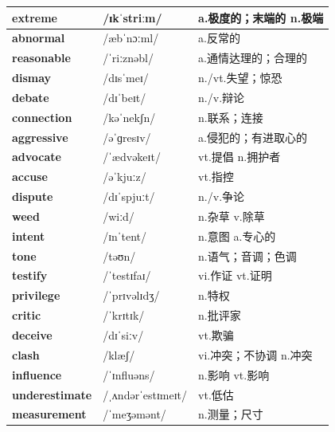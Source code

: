 \documentclass[14pt,a4paper]{extarticle}
\begin{document}
\begin{longtable}{ p{} p{} p{} }
\textbf{extreme} & /ɪkˈstriːm/ & a.极度的；末端的 \quad n.极端 \\ \hline
\textbf{abnormal} & /æbˈnɔːml/ & a.反常的 \\ \hline
\textbf{reasonable} & /ˈriːznəbl/ & a.通情达理的；合理的 \\ \hline
\textbf{dismay} & /dɪsˈmeɪ/ & n./vt.失望；惊恐 \\ \hline
\textbf{debate} & /dɪˈbeɪt/ & n./v.辩论 \\ \hline
\textbf{connection} & /kəˈnekʃn/ & n.联系；连接 \\ \hline
\textbf{aggressive} & /əˈɡresɪv/ & a.侵犯的；有进取心的 \\ \hline
\textbf{advocate} & /ˈædvəkeɪt/ & vt.提倡 \quad n.拥护者 \\ \hline
\textbf{accuse} & /əˈkjuːz/ & vt.指控 \\ \hline
\textbf{dispute} & /dɪˈspjuːt/ & n./v.争论 \\ \hline
\textbf{weed} & /wiːd/ & n.杂草 \quad v.除草 \\ \hline
\textbf{intent} & /ɪnˈtent/ & n.意图 \quad a.专心的 \\ \hline
\textbf{tone} & /təʊn/ & n.语气；音调；色调 \\ \hline
\textbf{testify} & /ˈtestɪfaɪ/ & vi.作证 \quad vt.证明 \\ \hline
\textbf{privilege} & /ˈprɪvəlɪdʒ/ & n.特权 \\ \hline
\textbf{critic} & /ˈkrɪtɪk/ & n.批评家 \\ \hline
\textbf{deceive} & /dɪˈsiːv/ & vt.欺骗 \\ \hline
\textbf{clash} & /klæʃ/ & vi.冲突；不协调 \quad n.冲突 \\ \hline
\textbf{influence} & /ˈɪnfluəns/ & n.影响 \quad vt.影响 \\ \hline
\textbf{underestimate} & /ˌʌndərˈestɪmeɪt/ & vt.低估 \\ \hline
\textbf{measurement} & /ˈmeʒəmənt/ & n.测量；尺寸 \\ \hline
\end{longtable}
\end{document}
